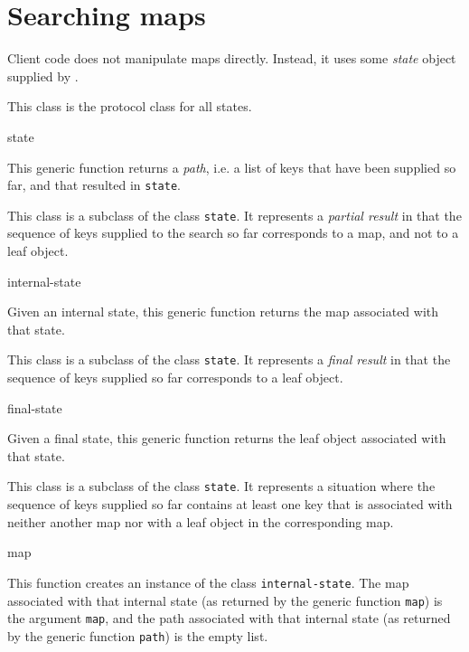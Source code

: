 \chapter{Searching maps}

Client code does not manipulate maps directly.  Instead, it uses some
\emph{state} object supplied by \sysname{}.


This class is the protocol class for all states.

 {state}

This generic function returns a \emph{path}, i.e. a list of keys that
have been supplied so far, and that resulted in \texttt{state}.


This class is a subclass of the class \texttt{state}.  It represents a
\emph{partial result} in that the sequence of keys supplied to the
search so far corresponds to a map, and not to a leaf object.

 {internal-state}

Given an internal state, this generic function returns the map
associated with that state.


This class is a subclass of the class \texttt{state}.  It represents a
\emph{final result} in that the sequence of keys supplied so far
corresponds to a leaf object.

 {final-state}

Given a final state, this generic function returns the leaf object
associated with that state.


This class is a subclass of the class \texttt{state}.  It represents a
situation where the sequence of keys supplied so far contains at least
one key that is associated with neither another map nor with a leaf
object in the corresponding map.

 {map}

This function creates an instance of the class
\texttt{internal-state}.  The map associated with that internal state
(as returned by the generic function \texttt{map}) is the argument
\texttt{map}, and the path associated with that internal state (as
returned by the generic function \texttt{path}) is the empty list.
